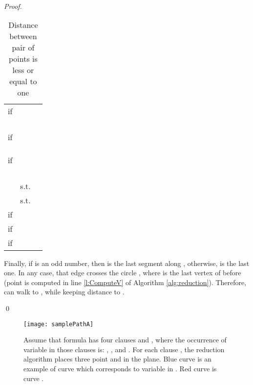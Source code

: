 \documentclass[a4paper,UKenglish]{lipics}
\begin{document}
\begin{proof}
\begin{table}[h]
\begin{tabular}{ r | l | l  }
\hline
if  &      & \\
&  & \\
&  & \\
&  &  \\
&   & \\




if  &  			  & \\
 &  &  \\
 &  &  \\
 &   &  \\






if  &  	  & \\
&  & \\
 & &  \\
 & &  \\
&   &  \\





\hline

	&   s.t.   & \\
	&  	 s.t.   & \\
\hline









 if   &  &  \\
   if   &  & \\
   if   &  & \\

\end{tabular}
\caption{Distance between pair of points is less or equal to one}
\label{tab:PathA}
\end{table}





Finally, if  is an odd number, then  
 is the last segment along , otherwise, 
 is the last one. In any case, 
that edge crosses  the circle , where  is the last vertex of 
 before  (point  is computed in line \ref{l:ComputeV} of 
Algorithm \ref{alg:reduction}). Therefore, 
  can walk to , while keeping distance  to . 


\qed
\end{proof}





\begin{figure}[t]
	\centering
	\texttt{[image: samplePathA]}
	\caption{Assume that formula  has four clauses  and , 
where the occurrence of variable   in those clauses is:
, ,  and .  
For each clause , the reduction algorithm places three point  and  in the plane. Blue curve is an example of curve  which corresponds to variable  in . Red curve is curve . 
 }
	\label{fig:pathAExample}
\end{figure}
\end{document}
